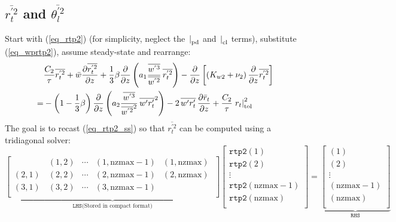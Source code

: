 \documentclass[11pt,fleqn]{article}
\newcommand{\ptlder}[2]{\frac{\partial #1}{\partial #2}}
\begin{document}
\subsection{ $\overline{r_t^{'2}}$ and $\overline{\theta_l^{'2}}$ }

Start with (\ref{eq_rtp2}) (for simplicity, neglect the 
$\left.\right|_{\rm{pd}}$ and $\left.\right|_{\rm{cl}}$ terms), substitute 
(\ref{eq_wprtp2}), assume steady-state and rearrange:
%
\begin{equation}
\begin{split}
\label{eq_rtp2_ss}
& \dfrac{C_2}{\tau} \overline{r_t^{'2}}
+ \bar{w}\ptlder{\overline{r^{'2}_t}}{z}
+ \frac{1}{3} \beta
   \ptlder{}{z}
     \left( 
       a_1
       \frac{\overline{w^{'3}}}{\overline{w^{'2}}} \,
       \overline{r_t^{'2}}
     \right)
- \ptlder{}{z} \left[ \left( K_{w2} + \nu_2 \right)
                      \ptlder{}{z} \overline{r_t^{'2}}
               \right]  \\
=& - \left( 1 - \frac{1}{3}\beta \right)
       \ptlder{}{z}
         \left( 
           a_2
           \frac{\overline{w^{'3}}}{\overline{w^{'2}}^2} \,
           \overline{w'r_t'}^2
         \right)
   - 2 \, \overline{w'r'_t} \, \ptlder{\bar{r}_t}{z} 
   + \dfrac{C_2}{\tau} \left. r_t \right|_{\rm{tol}}^{2}
\end{split}
\end{equation}
%
The goal is to recast (\ref{eq_rtp2_ss}) so that $\overline{r_t^{'2}}$
can be computed using a tridiagonal solver:
%
\begin{displaymath}
\underbrace{
\begin{bmatrix}
\phantom{(x,x)} & (1,2) & \cdots & (1,\mathrm{nzmax}-1) & (1,\mathrm{nzmax}) \\
(2,1)           & (2,2) & \cdots & (2,\mathrm{nzmax}-1) & (2,\mathrm{nzmax}) \\
(3,1)           & (3,2) & \cdots & (3,\mathrm{nzmax}-1) & \phantom{(x,nzmax)}\\
\end{bmatrix}}_{\mathtt{LHS} \textrm{(Stored in compact format)}}
\begin{bmatrix}
\mathtt{rtp2}(1) \\
\mathtt{rtp2}(2) \\
\vdots \\
\mathtt{rtp2}(\mathrm{nzmax}-1) \\
\mathtt{rtp2}(\mathrm{nzmax}) \\
\end{bmatrix}
=
\underbrace{
\begin{bmatrix}
(1) \\
(2) \\
\vdots \\
(\mathrm{nzmax-1}) \\
(\mathrm{nzmax}) \\
\end{bmatrix}}_{\mathtt{RHS}}
\end{displaymath}
\end{document}
